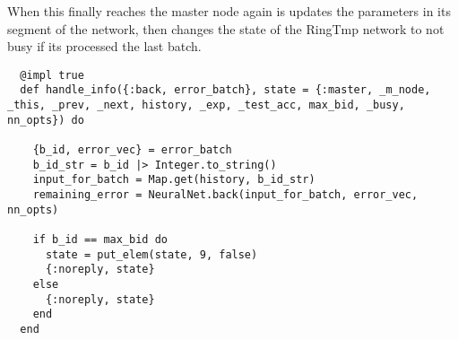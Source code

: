 When this finally reaches the master node again is updates the parameters in its
segment of the network, then changes the state of the RingTmp network to not busy
if its processed the last batch.
\begin{lstlisting}
  @impl true
  def handle_info({:back, error_batch}, state = {:master, _m_node, _this, _prev, _next, history, _exp, _test_acc, max_bid, _busy, nn_opts}) do

    {b_id, error_vec} = error_batch
    b_id_str = b_id |> Integer.to_string()
    input_for_batch = Map.get(history, b_id_str)
    remaining_error = NeuralNet.back(input_for_batch, error_vec, nn_opts)

    if b_id == max_bid do
      state = put_elem(state, 9, false)
      {:noreply, state}
    else
      {:noreply, state}
    end
  end
\end{lstlisting}









